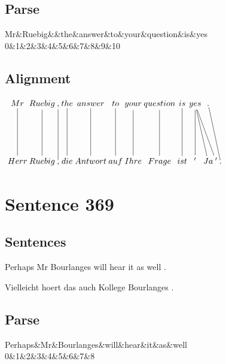 \documentclass{report}
\begin{document}
\subsection*{Parse}
\begin{dependency}[theme=simple]
\begin{deptext}[column sep=.5cm, row sep=.1ex]
Mr\&Ruebig\&\&the\&answer\&to\&your\&question\&is\&yes\\
0\&1\&2\&3\&4\&5\&6\&7\&8\&9\&10\\
\end{deptext}
\end{dependency}


\subsection*{Alignment}
\scriptsize{
$
\xymatrix@C-2.3pc{
Mr \ar @{-} [dd] & Ruebig \ar @{-} [dd] & , \ar @{-} [dd] & the \ar @{-} [dd] & answer \ar @{-} [dd] & to \ar @{-} [dd] & your \ar @{-} [dd] & question \ar @{-} [dd] & is \ar @{-} [dd] & yes \ar @{-} [dd] \ar @{-} [ddr] \ar @{-} [ddrr] & . \ar @{-} [ddrr]\\\\
Herr & Ruebig & , & die & Antwort & auf & Ihre & Frage & ist & ' & Ja & ' & .
}$}
\newpage\section*{Sentence 369}

\subsection*{Sentences}
Perhaps Mr Bourlanges will hear it as well .

\noindent Vielleicht hoert das auch Kollege Bourlanges .



\subsection*{Parse}
\begin{dependency}[theme=simple]
\begin{deptext}[column sep=.5cm, row sep=.1ex]
Perhaps\&Mr\&Bourlanges\&will\&hear\&it\&as\&well\\
0\&1\&2\&3\&4\&5\&6\&7\&8\\
\end{deptext}
\end{dependency}
\end{document}
